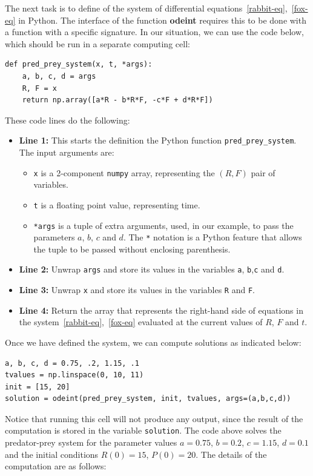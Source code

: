 The next task is to define of the system of differential equations~\eqref{rabbit-eq},~\eqref{fox-eq} in Python. The interface of the function \textbf{odeint} requires this to be done with a function with a specific signature. In our situation, we can use the code below, which should be run in a separate computing cell:
\begin{lstlisting}
def pred_prey_system(x, t, *args):
    a, b, c, d = args
    R, F = x
    return np.array([a*R - b*R*F, -c*F + d*R*F])
\end{lstlisting}
These code lines do the following:
\begin{itemize}
\item \textbf{Line 1:} This starts the definition the Python function \texttt{pred\_prey\_system}. The input arguments are:
	\begin{itemize}
	\item \texttt{x} is a 2-component \texttt{numpy} array, representing the $(R, F)$ pair of variables.
	\item \texttt{t} is a floating point value, representing time.
	\item \texttt{*args} is a tuple of extra arguments, used, in our example, to pass the parameters $a$, $b$, $c$ and $d$. The \texttt{*} notation is a Python feature that allows the tuple to be passed without enclosing parenthesis. 
	\end{itemize}
\item \textbf{Line 2:} Unwrap \texttt{args} and store its values in the variables \texttt{a}, \texttt{b},\texttt{c} and \texttt{d}.
\item \textbf{Line 3:} Unwrap \texttt{x} and store its values in the variables \texttt{R} and \texttt{F}.
\item \textbf{Line 4:} Return the array that represents the right-hand side of equations in the system~\eqref{rabbit-eq},~\eqref{fox-eq} evaluated at the current values of $R$, $F$ and $t$.
\end{itemize}
Once we have defined the system, we can compute solutions as indicated below:
\begin{lstlisting}
a, b, c, d = 0.75, .2, 1.15, .1
tvalues = np.linspace(0, 10, 11)
init = [15, 20]
solution = odeint(pred_prey_system, init, tvalues, args=(a,b,c,d))
\end{lstlisting}
Notice that running this cell will not produce any output, since the result of the computation is stored in the variable \texttt{solution}. The code above solves the predator-prey system for the parameter values $a=0.75$, $b=0.2$, $c=1.15$, $d=0.1$ and the initial conditions $R(0)=15$, $P(0)=20$. The details of the computation are as follows:
